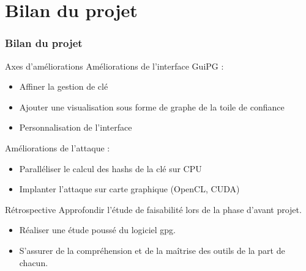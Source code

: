 \section{Bilan du projet}
  \begin{frame}
    \frametitle{\color{white}Bilan du projet}
    \begin{block}{Axes d'améliorations}
      Améliorations de l'interface GuiPG :
      \begin{itemize}
        \item Affiner la gestion de clé
        \item Ajouter une visualisation sous forme de graphe de la toile de confiance
        \item Personnalisation de l'interface
      \end{itemize}
      Améliorations de l'attaque :
      \begin{itemize}
        \item Paralléliser le calcul des hashs de la clé sur CPU
        \item Implanter l'attaque sur carte graphique (OpenCL, CUDA)
      \end{itemize}
    \end{block}
    
    \begin{block}{Rétrospective}
    Approfondir l'étude de faisabilité lors de la phase d'avant projet.
      \begin{itemize}
        \item Réaliser une étude poussé du logiciel gpg.
        \item S'assurer de la compréhension et de la maîtrise des outils de la part de chacun.
      \end{itemize}
    \end{block}


  \end{frame}
